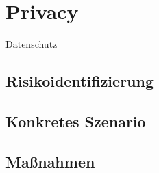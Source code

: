 \section{Privacy}
Datenschutz
\subsection{Risikoidentifizierung}
\subsection{Konkretes Szenario}
\subsection{Maßnahmen}